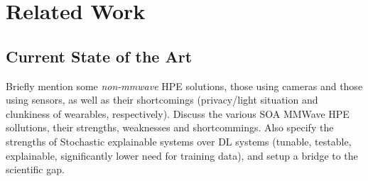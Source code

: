\section{Related Work}
\label{section: background - related work}






\subsection{Current State of the Art}
\label{sub-section: background - related work - current soa}
Briefly mention some \textit{non-mmwave} HPE solutions, those using cameras and those using sensors, as well as their shortcomings (privacy/light situation and clunkiness of wearables, respectively).
Discuss the various SOA MMWave HPE sollutions, their strengths, weaknesses and shortcommings.
Also specify the strengths of Stochastic explainable systems over DL systems (tunable, testable, explainable, significantly lower need for training data), and setup a bridge to the scientific gap.
